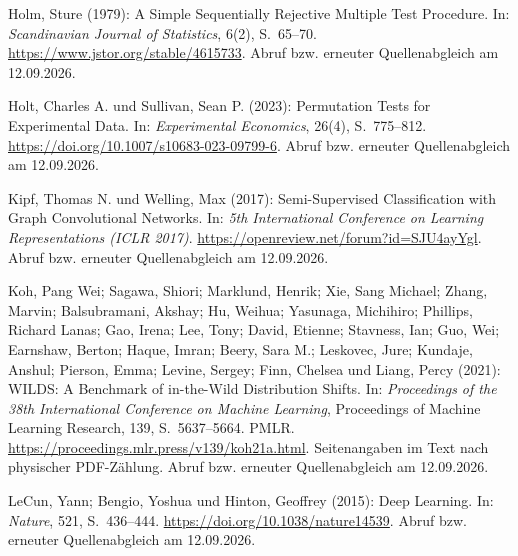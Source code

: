 \begin{samepage}
\noindent
Holm, Sture (1979):
A Simple Sequentially Rejective Multiple Test Procedure.
In: \textit{Scandinavian Journal of Statistics}, 6(2), S.~65--70.
\url{https://www.jstor.org/stable/4615733}.
Abruf bzw. erneuter Quellenabgleich am 12.09.2026.
\par\end{samepage}
\par\smallskip
\begin{samepage}
\noindent
Holt, Charles A. und Sullivan, Sean P. (2023):
Permutation Tests for Experimental Data.
In: \textit{Experimental Economics}, 26(4), S.~775--812.
\url{https://doi.org/10.1007/s10683-023-09799-6}.
Abruf bzw. erneuter Quellenabgleich am 12.09.2026.
\par\end{samepage}
\par\smallskip
\begin{samepage}
\noindent
Kipf, Thomas N. und Welling, Max (2017):
Semi-Supervised Classification with Graph Convolutional Networks.
In: \textit{5th International Conference on Learning Representations (ICLR 2017)}.
\url{https://openreview.net/forum?id=SJU4ayYgl}.
Abruf bzw. erneuter Quellenabgleich am 12.09.2026.
\par\end{samepage}
\par\smallskip
\begin{samepage}
\noindent
Koh, Pang Wei; Sagawa, Shiori; Marklund, Henrik; Xie, Sang Michael;
Zhang, Marvin; Balsubramani, Akshay; Hu, Weihua; Yasunaga, Michihiro;
Phillips, Richard Lanas; Gao, Irena; Lee, Tony; David, Etienne;
Stavness, Ian; Guo, Wei; Earnshaw, Berton; Haque, Imran;
Beery, Sara M.; Leskovec, Jure; Kundaje, Anshul; Pierson, Emma;
Levine, Sergey; Finn, Chelsea und Liang, Percy (2021):
WILDS: A Benchmark of in-the-Wild Distribution Shifts.
In: \textit{Proceedings of the 38th International Conference on Machine Learning},
Proceedings of Machine Learning Research, 139, S.~5637--5664.
PMLR.
\url{https://proceedings.mlr.press/v139/koh21a.html}. Seitenangaben im Text nach physischer PDF-Zählung.
Abruf bzw. erneuter Quellenabgleich am 12.09.2026.
\par\end{samepage}
\par\smallskip
\begin{samepage}
\noindent
LeCun, Yann; Bengio, Yoshua und Hinton, Geoffrey (2015):
Deep Learning.
In: \textit{Nature}, 521, S.~436--444.
\url{https://doi.org/10.1038/nature14539}.
Abruf bzw. erneuter Quellenabgleich am 12.09.2026.
\par\end{samepage}
